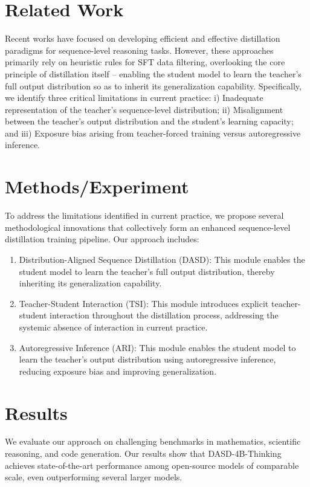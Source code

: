 \documentclass{article}
\begin{document}
\section{Related Work}
Recent works have focused on developing efficient and effective distillation paradigms for sequence-level reasoning tasks. However, these approaches primarily rely on heuristic rules for SFT data filtering, overlooking the core principle of distillation itself -- enabling the student model to learn the teacher's full output distribution so as to inherit its generalization capability. Specifically, we identify three critical limitations in current practice: i) Inadequate representation of the teacher's sequence-level distribution; ii) Misalignment between the teacher's output distribution and the student's learning capacity; and iii) Exposure bias arising from teacher-forced training versus autoregressive inference.

\section{Methods/Experiment}
To address the limitations identified in current practice, we propose several methodological innovations that collectively form an enhanced sequence-level distillation training pipeline. Our approach includes:

\begin{enumerate}
    \item Distribution-Aligned Sequence Distillation (DASD): This module enables the student model to learn the teacher's full output distribution, thereby inheriting its generalization capability.
    \item Teacher-Student Interaction (TSI): This module introduces explicit teacher-student interaction throughout the distillation process, addressing the systemic absence of interaction in current practice.
    \item Autoregressive Inference (ARI): This module enables the student model to learn the teacher's output distribution using autoregressive inference, reducing exposure bias and improving generalization.
\end{enumerate}

\section{Results}
We evaluate our approach on challenging benchmarks in mathematics, scientific reasoning, and code generation. Our results show that DASD-4B-Thinking achieves state-of-the-art performance among open-source models of comparable scale, even outperforming several larger models.
\end{document}

